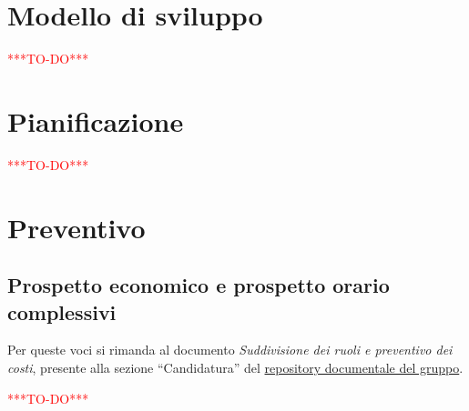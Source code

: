 \newpage
\section{Modello di sviluppo}\label{sec:modello_sviluppo}

\begin{center}
    \textcolor{red}{***TO-DO***}
\end{center}

\newpage
\section{Pianificazione}\label{sec:pianificazione}

\begin{center}
    \textcolor{red}{***TO-DO***}
\end{center}

\newpage
\section{Preventivo}\label{sec:preventivo}
\subsection{Prospetto economico e prospetto orario complessivi}\label{sec:preventivo:totale}
Per queste voci si rimanda al documento \textit{Suddivisione dei ruoli e preventivo dei  costi}, presente alla sezione ``Candidatura'' del \href{https://avant-garde-software-engineering.github.io/documentazione.html}{repository documentale del gruppo}.

\begin{center}
    \textcolor{red}{***TO-DO***}
\end{center}

\newpage

